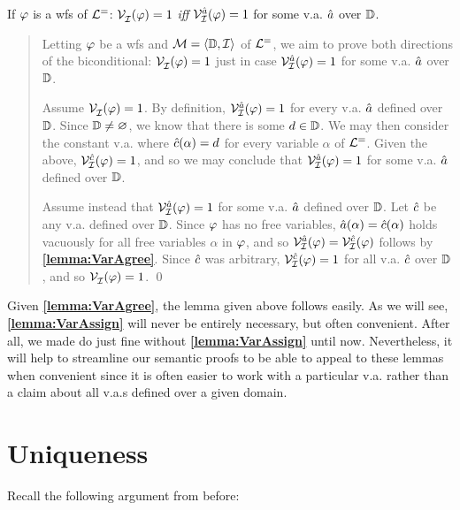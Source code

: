 \vspace{.05in}
\begin{Lthm} \label{lemma:VarAssign}
  If $\varphi$ is a wfs of $\mathcal{L}^{=}$: $\mathcal{V}_{\mathcal{I}}^{}(\varphi) = 1$ \textit{iff} $\mathcal{V}_{\mathcal{I}}^{\hat{a}}(\varphi) = 1$ for some v.a. $\hat{a}$ over $\mathbb{D}$.
\end{Lthm}

\begin{quote}
  Letting $\varphi$ be a wfs and $\mathcal{M} = \langle\mathbb{D}, \mathcal{I}\rangle$ of $\mathcal{L}^{=}$, we aim to prove both directions of the biconditional: $\mathcal{V}_{\mathcal{I}}^{}(\varphi)= 1$ just in case $\mathcal{V}_{\mathcal{I}}^{\hat{a}}(\varphi)= 1$ for some v.a. $\hat{a}$ over $\mathbb{D}$.

  Assume $\mathcal{V}_{\mathcal{I}}^{}(\varphi) = 1$.
  By definition, $\mathcal{V}_{\mathcal{I}}^{\hat{a}}(\varphi) = 1$ for every v.a. $\hat{a}$ defined over $\mathbb{D}$.
  Since $\mathbb{D} \neq \varnothing$, we know that there is some $d \in \mathbb{D}$.
  We may then consider the constant v.a. where $\hat{c}(\alpha) = d$ for every variable $\alpha$ of $\mathcal{L}^{=}$.
  Given the above, $\mathcal{V}_{\mathcal{I}}^{\hat{c}}(\varphi)= 1$, and so we may conclude that $\mathcal{V}_{\mathcal{I}}^{\hat{a}}(\varphi)= 1$ for some v.a. $\hat{a}$ defined over $\mathbb{D}$.
  
  Assume instead that $\mathcal{V}_{\mathcal{I}}^{\hat{a}}(\varphi)=1$ for some v.a. $\hat{a}$ defined over $\mathbb{D}$.
  Let $\hat{c}$ be any v.a. defined over $\mathbb{D}$.
  Since $\varphi$ has no free variables, $\hat{a}(\alpha) = \hat{c}(\alpha)$ holds vacuously for all free variables $\alpha$ in $\varphi$, and so $\mathcal{V}_{\mathcal{I}}^{\hat{a}}(\varphi)=\mathcal{V}_{\mathcal{I}}^{\hat{c}}(\varphi)$ follows by \textbf{\ref{lemma:VarAgree}}.
  Since $\hat{c}$ was arbitrary, $\mathcal{V}_{\mathcal{I}}^{\hat{c}}(\varphi)=1$ for all v.a. $\hat{c}$ over $\mathbb{D}$, and so $\mathcal{V}_{\mathcal{I}}^{}(\varphi)=1$.
  \qed
\end{quote}

Given \textbf{\ref{lemma:VarAgree}}, the lemma given above follows easily.
As we will see, \textbf{\ref{lemma:VarAssign}} will never be entirely necessary, but often convenient.
After all, we made do just fine without \textbf{\ref{lemma:VarAssign}} until now.
Nevertheless, it will help to streamline our semantic proofs to be able to appeal to these lemmas when convenient since it is often easier to work with a particular v.a. rather than a claim about all v.a.s defined over a given domain.





\section{Uniqueness}

Recall the following argument from before:

